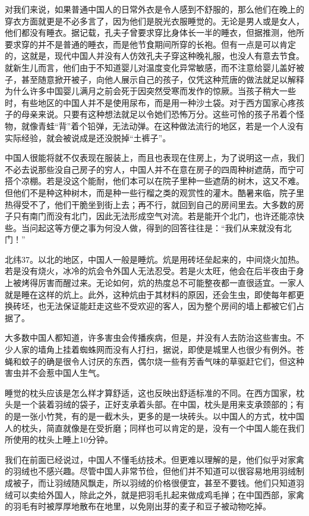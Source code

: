 \documentclass[12pt,oneside]{book}
\begin{document}
\begin{common-format}
对我们来说，如果普通中国人的日常外衣是令人感到不舒服的，那么他们在晚上的穿衣方面就更是不必多言了，因为他们是脱光衣服睡觉的。无论是男人或是女人，他们都没有睡衣。据记载，孔夫子曾要求穿比身体长一半的睡衣，但据推测，他所要求穿的并不是普通的睡衣，而是他节食期间所穿的长袍。但有一点是可以肯定的，这就是，现代中国人并没有人仿效孔夫子穿这种晚礼服，也没人有意去节食。就新生儿而言，他们由于不知道婴儿对温度变化异常敏感，而不注意给婴儿盖好被子，甚至随意掀开被子，向他人展示自己的孩子，仅凭这种荒唐的做法就足以解释为什么许多中国婴儿满月之前会死于因突然受寒而发作的惊厥。当孩子稍大一些时，有些地区的中国人并不是使用尿布，而是用一种沙土袋。对于西方国家心疼孩子的母亲来说。只要有这种想法就足以令她们恐怖万分。这些可怜的孩子吊着个怪物，就像青蛙“背”着个铅弹，无法动弹。在这种做法流行的地区，若是一个人没有实际经验，就会被说成是还没脱掉“土裤子”。 

中国人很能将就不仅表现在服装上，而且也表现在住房上，为了说明这一点，我们不必去说那些没自己房子的穷人，中国人并不在意在房子的四周种树遮荫，而宁可搭个凉棚。若是没这个能耐，他们本可以在院子里种一些遮荫的树木，这又不难。但他们不是种这种树木，而是种一些行榴之类的观赏性的灌木。酷暑来临，院子里热得受不了，他们干脆坐到街上去；再不行，就回到自己的房间里去。大多数的房子只有南门而没有北门，因此无法形成空气对流。若是能开个北门，也许还能凉快些。当问起这等方便之事为何没人做，得到的回答往往是：“我们从来就没有北门！” 

北纬37。以北的地区，中国人一般是睡炕。炕是用砖坯垒起来的，中间烧火加热。若是没有烧火，冰冷的炕会令外国人无法忍受。若是火太旺，他会在后半夜由于身上被烤得厉害而醒过来。无论如何，炕的热度总不可能整夜都一直很适宜。一家人就是睡在这样的炕上。此外，这种炕由于其材料的原因，还会生虫，即使每年都更换砖坯，也无法保证能赶走这些不受欢迎的客人，因为整个房间的墙上都被它们占据了。 

大多数中国人都知道，许多害虫会传播疾病，但是，并没有人去防治这些害虫。不少人家的墙角上挂着蜘蛛网而没有人打扫，据说，即使是城里人也很少有例外。苍蝇和蚊子的确是很令人讨厌的东西，偶尔烧一些有芳香气味的草驱赶它们，但这种害虫并不会惹中国人生气。 

睡觉的枕头应该是怎么样才算舒适，这也反映出舒适标准的不同。在西方国家，枕头是一个装着羽绒的袋子，正好支承着头部。在中国，枕头是用来支承颈部的；有的是一张小竹凳，有的是一截木头，更多的是一块砖头。以中国人的方式，枕中国人的枕头，简直就像是在受折磨；同样也可以肯定的是，没有一个中国人能在我们所使用的枕头上睡上10分钟。 

我们在前面已经说过，中国人不懂毛纺技术。但更难以理解的是，他们似乎对家禽的羽绒也不感兴趣。尽管中国人非常节俭，但他们并不知道可以很容易地用羽绒制成被子，而让羽绒随风飘走，所以羽绒的价格很便宜，甚至不要钱。他们只知道羽绒可以卖给外国人，除此之外，就是把羽毛扎起来做成鸡毛掸；在中国西部，家禽的羽毛有时被厚厚地散布在地里，以免刚出芽的麦子和豆子被动物吃掉。 


\end{common-format}
\end{document}
